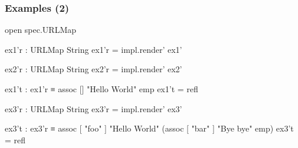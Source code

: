 \documentclass[aspectratio=169]{beamer}
\begin{document}
\begin{frame}
\frametitle{Examples (2)}
\begin{code}
open spec.URLMap

ex1'r : URLMap String
ex1'r = impl.render' ex1'

ex2'r : URLMap String
ex2'r = impl.render' ex2'

ex1't : ex1'r ≡ assoc [] "Hello World" emp
ex1't = refl

ex3'r : URLMap String
ex3'r = impl.render' ex3'

ex3't : ex3'r ≡ assoc [ "foo" ] "Hello World"
               (assoc [ "bar" ] "Bye bye"
                emp)
ex3't = refl
\end{code}
\end{frame}
\end{document}
